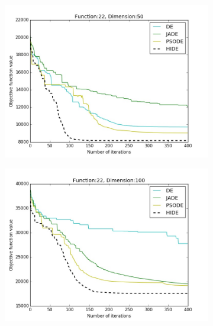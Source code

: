 \documentclass[a4paper,twoside]{article}
\begin{document}
\begin{figure}[t!]
\begin{subfigure}[b]{0.24\textwidth}
        \includegraphics[width=\textwidth,natwidth=800,natheight=600]{plot_50D_F22_save}
        \caption{}
    \end{subfigure}
    \begin{subfigure}[b]{0.24\textwidth}
        \includegraphics[width=\textwidth,natwidth=800,natheight=600]{plot_100D_F22_save}
        \caption{}
    \end{subfigure}



\end{figure}
\end{document}
